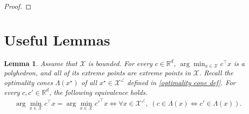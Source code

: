 \documentclass[11pt]{article}
\theoremstyle{plain}
\newtheorem{lemma}{Lemma}
\theoremstyle{definition}
\newcommand{\R}[0]{\mathbb R}
\newcommand{\cX}{\mathcal{X}}
\begin{document}
\begin{proof}
   
\end{proof}




\section{Useful Lemmas}

  \begin{lemma} \label{cone equivalence}
            Assume that $\cX$ is bounded. For every $c\in \R^d$, $\arg\min_{x\in \cX}c^\top x$ is a polyhedron, and all of its extreme points are extreme points in $\cX$. Recall the optimality cones $\Lambda(x^\star)$ of all $x^\star \in \cX^\angle$ defined in \cref{optimality cone def}.  For every $c,c'\in \R^d$, the following equivalence holds.
            \begin{align*}
                \arg\min_{x\in \cX}c^\top x=\arg\min_{x\in \cX}c'^\top x \Longleftrightarrow \forall x \in \cX^\angle,\; \left(c\in \Lambda (x)\Longleftrightarrow c'\in \Lambda(x)\right).
            \end{align*}
        \end{lemma}
        
\end{document}
